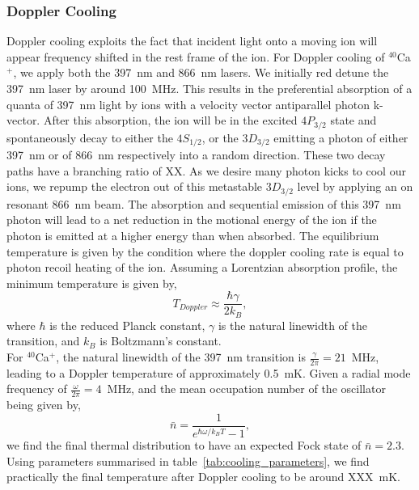 \documentclass[12pt]{report}
\begin{document}
    \subsubsection{Doppler Cooling}
    Doppler cooling exploits the fact that incident light onto a moving ion will
    appear frequency shifted in the rest frame of the ion. For Doppler cooling
    of $^{40}$Ca$^+$, we apply both the 397~nm and 866~nm lasers. We initially red
    detune the 397~nm laser by around 100~MHz. This results in the preferential
    absorption of a quanta of 397~nm light by ions with a velocity vector
    antiparallel photon k-vector. After this absorption, the ion will be in the
    excited $4P_{3/2}$ state and spontaneously decay to either the $4S_{1/2}$,
    or the $3D_{3/2}$ emitting a photon of either 397~nm or of 866~nm
    respectively into a random direction. These two decay paths have a branching
    ratio of XX.  As we desire many photon kicks to cool our ions, we repump the
    electron out of this metastable $3D_{3/2}$ level by applying an on resonant
    866~nm beam.  The absorption and sequential emission of this 397~nm photon
    will lead to a net reduction in the motional energy of the ion if the photon
    is emitted at a higher energy than when absorbed. The equilibrium
    temperature is given by the condition where the doppler cooling rate is
    equal to photon recoil heating of the ion. Assuming a Lorentzian absorption
    profile, the minimum temperature is given by,
    \begin{equation}
    T_{Doppler} \approx \frac{\hbar\gamma}{2k_B},
    \end{equation}
    where $\hbar$ is the reduced Planck constant, $\gamma$ is the natural
    linewidth of the transition, and $k_B$ is Boltzmann's constant.\\ For
    $^{40}$Ca$^+$, the natural linewidth of the 397~nm transition is $\frac{\gamma}{2\pi} =
    21$~MHz, leading to a Doppler temperature of approximately 0.5~mK. Given a radial mode frequency of $\frac{\omega}{2\pi} = 4$~MHz, and the mean occupation number of the oscillator being given by,
    \begin{equation}
        \bar{n} = \frac{1}{e^{\hbar\omega/k_B T}-1},
    \end{equation}
    we find the final thermal distribution to have an expected Fock state of $\bar{n} = 2.3$.
    Using parameters summarised in table~\ref{tab:cooling_parameters}, we find practically the final temperature after Doppler cooling to be around XXX~mK.\\
\end{document}
